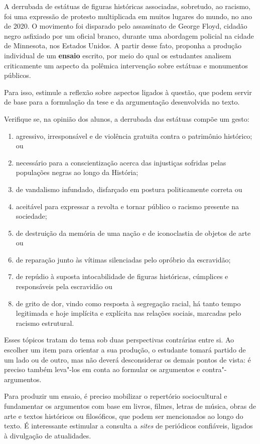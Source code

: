 \documentclass[12pt]{extarticle}
\begin{document}
A derrubada de estátuas de figuras históricas associadas, sobretudo,
ao racismo, foi uma expressão de protesto multiplicada em muitos
lugares do mundo, no ano de 2020. O movimento foi disparado pelo
assassinato de George Floyd, cidadão negro asfixiado por um oficial
branco, durante uma abordagem policial na cidade de Minnesota, nos
Estados Unidos. A partir desse fato, proponha a produção individual de
um \textbf{ensaio} escrito, por meio do qual os estudantes analisem
criticamente um aspecto da polêmica intervenção sobre estátuas e
monumentos públicos. 


Para isso, estimule a reflexão sobre aspectos
ligados à questão, que podem servir de base para a formulação da tese
e da argumentação desenvolvida no texto.

Verifique se, na opinião dos alunos, a derrubada das estátuas compõe um
gesto: 

\begin{enumerate}
\item agressivo, irresponsável e de violência gratuita contra o
patrimônio histórico; ou 
\item necessário para a conscientização acerca
das injustiças sofridas pelas populações negras ao longo da História;
\item de vandalismo infundado, disfarçado em postura politicamente correta
ou 
\item aceitável para expressar a revolta e tornar público o racismo
presente na sociedade; 
\item de destruição da memória de uma nação e de
iconoclastia de objetos de arte ou 
\item de reparação junto às vítimas
silenciadas pelo opróbrio da escravidão; 
\item de repúdio à suposta
intocabilidade de figuras históricas, cúmplices e responsáveis pela
escravidão ou 
\item de grito de dor, vindo como resposta à segregação
racial, há tanto tempo legitimada e hoje implícita e explícita nas
relações sociais, marcadas pelo racismo estrutural.
\end{enumerate}

Esses tópicos tratam do tema sob duas perspectivas contrárias entre si.
Ao escolher um item para orientar a sua produção, o estudante tomará
partido de um lado ou de outro, mas não deverá desconsiderar os demais
pontos de vista: é preciso também leva"-los em conta ao formular os
argumentos e contra"-argumentos.

Para produzir um ensaio, é preciso mobilizar o repertório sociocultural
e fundamentar os argumentos com base em livros, filmes, letras de
música, obras de arte e textos históricos ou filosóficos, que podem ser
mencionados ao longo do texto. É interessante estimular a consulta a
\emph{sites} de periódicos confiáveis, ligados à divulgação de
atualidades.
\end{document}

